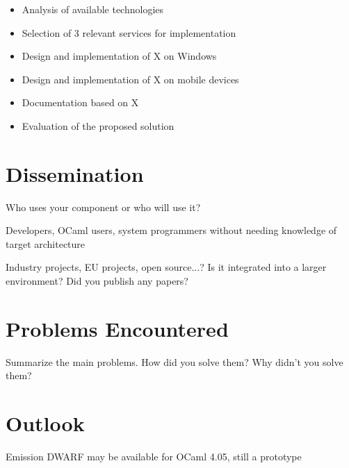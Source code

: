 \begin{itemize}
		\item Analysis of available technologies
		\vspace{-0.11in}
		\item Selection of 3 relevant services for implementation
		\vspace{-0.11in}
		\item Design and implementation of X on Windows
		\vspace{-0.11in}
		\item Design and implementation of X on mobile devices
		\vspace{-0.11in}
		\item Documentation based on X
		\vspace{-0.11in}
		\item Evaluation of the proposed solution
\end{itemize}

\section{Dissemination\label{sec:dissemination}}

Who uses your component or who will use it?

Developers, OCaml users, system programmers
without needing knowledge of target architecture

Industry projects, EU projects, open source...? Is it integrated into a larger environment? Did you publish any papers?

\section{Problems Encountered\label{sec:problems}}

Summarize the main problems. How did you solve them? Why didn't you solve them?

\section{Outlook\label{sec:outlook}}
Emission DWARF \autocite{libmond} \autocite{dwpr}
may be available for OCaml 4.05, still a prototype


